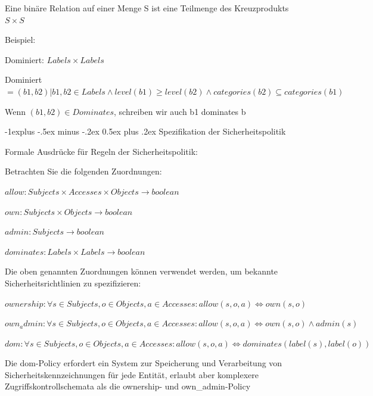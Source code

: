 \documentclass[a4paper]{article}
\makeatletter
\renewcommand{\subsection}{\@startsection{subsection}{2}{0mm}%
 {-1explus -.5ex minus -.2ex}%
 {0.5ex plus .2ex}%
 {\normalfont\normalsize\bfseries}}
\makeatother
\begin{document}
\begin{multicols}{3}
\begin{itemize*}
\begin{itemize*}
                  \item Eine binäre Relation auf einer Menge S ist eine Teilmenge des Kreuzprodukts $S\times S$
                  \item Beispiel:
                  \begin{itemize*} \item Dominiert: $Labels \times Labels$ \item Dominiert $={(b1,b2) | b1, b2 \in Labels \wedge level(b1) \geq level(b2) \wedge categories(b2) \subseteq categories(b1)}$ \item Wenn $(b1, b2) \in Dominates$, schreiben wir auch b1 dominates b \end{itemize*}
            \end{itemize*}
      \end{itemize*}


      \subsection{Spezifikation der
            Sicherheitspolitik}

      \begin{itemize*}
            \item Formale Ausdrücke für Regeln der Sicherheitspolitik:
            \item Betrachten Sie die folgenden Zuordnungen:
            \begin{itemize*}
                  \item $allow: Subjects \times Accesses \times Objects \rightarrow boolean$
                  \item $own: Subjects \times Objects \rightarrow boolean$
                  \item $admin: Subjects \rightarrow boolean$
                  \item $dominates: Labels \times Labels \rightarrow boolean$
            \end{itemize*}
            \item Die oben genannten Zuordnungen können verwendet werden, um bekannte
            Sicherheitsrichtlinien zu spezifizieren:
            \begin{itemize*}
                  \item $ownership: \forall s \in Subjects, o \in Objects, a \in Accesses: allow(s, o, a) \Leftrightarrow own(s, o)$
                  \item $own_admin: \forall s \in Subjects, o \in Objects, a \in Accesses: allow(s, o, a) \Leftrightarrow own(s, o) \wedge admin(s)$
                  \item $dom: \forall s \in Subjects, o \in Objects, a \in Accesses: allow(s, o, a) \Leftrightarrow dominates(label(s), label(o))$
            \end{itemize*}
            \item Die dom-Policy erfordert ein System zur Speicherung und Verarbeitung von Sicherheitskennzeichnungen für jede Entität, erlaubt aber komplexere Zugriffskontrollschemata als die ownership- und own\_admin-Policy
      \end{itemize*}



\end{multicols}
\end{document}
